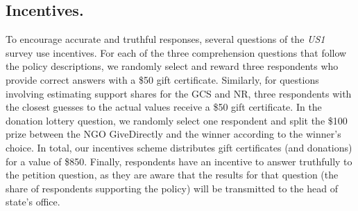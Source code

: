 \begin{small}
\subsection*{\small Incentives.} %
To encourage accurate and truthful responses, several questions of the \textit{US1} survey use incentives. For each of the three comprehension questions that follow the policy descriptions, we randomly select and reward three respondents who provide correct answers with a \$50 gift certificate. Similarly, for questions involving estimating support shares for the GCS and NR, three respondents with the closest guesses to the actual values receive a \$50 gift certificate. In the donation lottery question, we randomly select one respondent and split the \$100 prize between the NGO GiveDirectly and the winner according to the winner's choice. In total, our incentives scheme distributes gift certificates (and donations) for a value of \$850. Finally, respondents have an incentive to answer truthfully to the petition question, as they are aware that the results for that question (the share of respondents supporting the policy) will be transmitted to the head of state's office.







\end{small}
